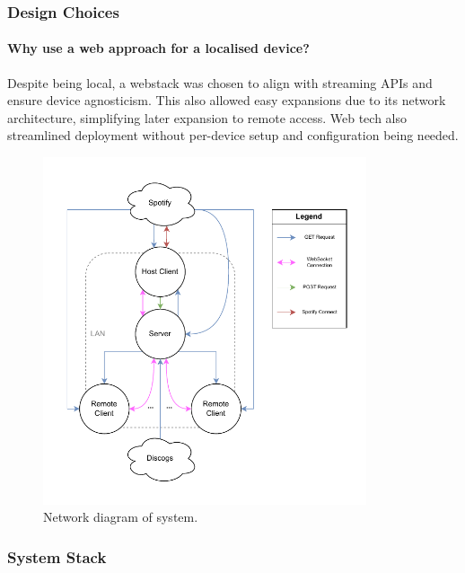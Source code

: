             \subsubsection{Design Choices}
    
                \paragraph{Why use a web approach for a localised device?} Despite being local, a webstack was chosen to align with streaming APIs and ensure device agnosticism. This also allowed easy expansions due to its network architecture, simplifying later expansion to remote access. Web tech also streamlined deployment without per-device setup and configuration being needed.
    
                \begin{figure}[h]
                    \centering
                    \includegraphics[width=0.85\textwidth]{images/VTT_network.NetworkDiagram.pdf}
                    \caption{Network diagram of system. }
                    \label{fig:networkDiagram}
                \end{figure}
        
            \subsubsection{System Stack}
    
